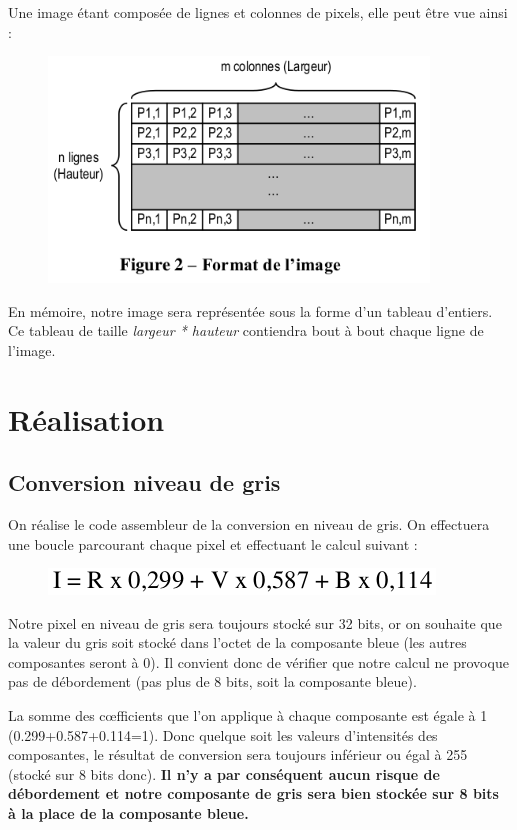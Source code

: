 \noindent Une image étant composée de lignes et colonnes de pixels, elle peut être vue ainsi :
\begin{figure}[!h]
   \centering\includegraphics[height=6cm]{img/image_struct.png}
\end{figure}

En mémoire, notre image sera représentée sous la forme d'un tableau d'entiers. Ce tableau de taille \textit{largeur * hauteur} contiendra bout à bout chaque ligne de l'image.

\section{Réalisation}
\subsection{Conversion niveau de gris}

On réalise le code assembleur de la conversion en niveau de gris. On effectuera une boucle parcourant chaque pixel et effectuant le calcul suivant :
\begin{figure}[!h]
   \centering\includegraphics{img/formule.png}
\end{figure}

Notre pixel en niveau de gris sera toujours stocké sur 32 bits, or on souhaite que la valeur du gris soit stocké dans l'octet de la composante bleue (les autres composantes seront à 0). Il convient donc de vérifier que notre calcul ne provoque pas de débordement (pas plus de 8 bits, soit la composante bleue).

\medskip

La somme des c\oe{}fficients que l'on applique à chaque composante est égale à 1 (0.299+0.587+0.114=1). Donc quelque soit les valeurs d'intensités des composantes, le résultat de conversion sera toujours inférieur ou égal à 255 (stocké sur 8 bits donc). \textbf{Il n'y a par conséquent aucun risque de débordement et notre composante de gris sera bien stockée sur 8 bits à la place de la composante bleue.}

